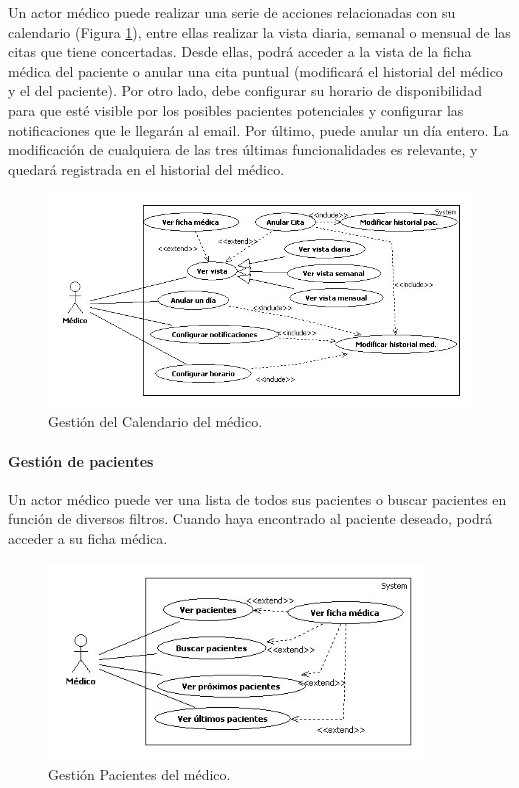 				Un actor médico puede realizar una serie de acciones relacionadas con su calendario (Figura \ref{fig:cal_med}), entre ellas realizar la vista diaria, semanal o mensual de las citas que tiene concertadas. Desde ellas, podrá acceder a la vista de la ficha médica del paciente o anular una cita puntual (modificará el historial del médico y el del paciente). Por otro lado, debe configurar su horario de disponibilidad para que esté visible por los posibles pacientes potenciales y configurar las notificaciones que le llegarán al email. Por último, puede anular un día entero. La modificación de cualquiera de las tres últimas funcionalidades es relevante, y quedará registrada en el historial del médico.
				\begin{figure}[H]
				  \centering
				    \includegraphics[width=14cm]{img/jpg/casos_uso/Gestion_calendario.jpg}
				  \caption{Gestión del Calendario del médico.}
				  \label{fig:cal_med}
				\end{figure}
		
			\paragraph{Gestión de pacientes} %
			\label{par:gestion_de_pacientes}
				Un actor médico puede ver una lista de todos sus pacientes o buscar pacientes en función de diversos filtros. Cuando haya encontrado al paciente deseado, podrá acceder a su ficha médica.
				\begin{figure}[H]
				  \centering
				    \includegraphics[width=10cm]{img/jpg/casos_uso/Gestion_Pacientes.jpg}
				  \caption{Gestión Pacientes del médico.}
				  \label{fig:pac_med}
				\end{figure}
		
